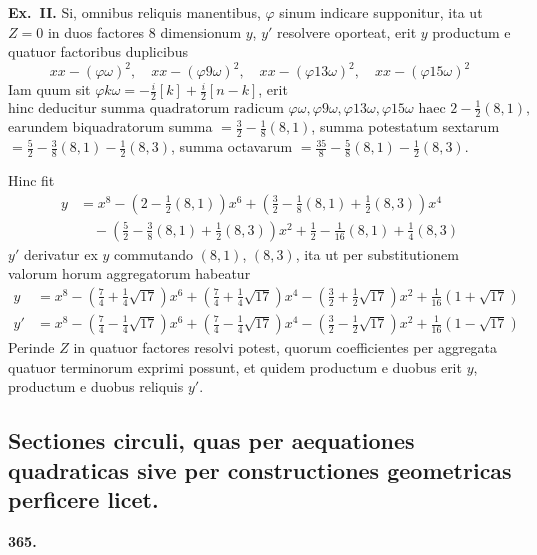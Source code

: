 \documentclass[12pt,a4paper]{article}
\theoremstyle{plain}
\theoremstyle{definition}
\theoremstyle{remark}
\begin{document}
\textbf{Ex.\ II.} Si, omnibus reliquis manentibus, $\varphi$ sinum indicare supponitur, ita ut $Z = 0$ in duos factores $8$ dimensionum $y$, $y'$ resolvere oporteat, erit $y$ productum e quatuor factoribus duplicibus
\[xx - (\varphi\omega)^2, \quad xx - (\varphi9\omega)^2, \quad xx - (\varphi13\omega)^2, \quad xx - (\varphi15\omega)^2\]
Iam quum sit $\varphi k\omega = -\tfrac{i}{2}[k] + \tfrac{i}{2}[n-k]$, erit
\[\text{hinc deducitur summa quadratorum radicum } \varphi\omega, \varphi9\omega, \varphi13\omega, \varphi15\omega \text{ haec } 2 - \tfrac{1}{2}(8,1),\]
earundem biquadratorum summa $= \tfrac{3}{2} - \tfrac{1}{8}(8,1)$, summa potestatum sextarum $= \tfrac{5}{2} - \tfrac{3}{8}(8,1) - \tfrac{1}{2}(8,3)$, summa octavarum $= \tfrac{35}{8} - \tfrac{5}{8}(8,1) - \tfrac{1}{2}(8,3)$.

Hinc fit
\begin{align*}
y &= x^8 - (2 - \tfrac{1}{2}(8,1))x^6 + (\tfrac{3}{2} - \tfrac{1}{8}(8,1) + \tfrac{1}{2}(8,3))x^4 \\
&\quad - (\tfrac{5}{2} - \tfrac{3}{8}(8,1) + \tfrac{1}{2}(8,3))x^2 + \tfrac{1}{2} - \tfrac{1}{16}(8,1) + \tfrac{1}{4}(8,3)
\end{align*}
$y'$ derivatur ex $y$ commutando $(8,1)$, $(8,3)$, ita ut per substitutionem valorum horum aggregatorum habeatur
\begin{align*}
y &= x^8 - (\tfrac{7}{4} + \tfrac{1}{4}\sqrt{17})x^6 + (\tfrac{7}{4} + \tfrac{1}{4}\sqrt{17})x^4 - (\tfrac{3}{2} + \tfrac{1}{2}\sqrt{17})x^2 + \tfrac{1}{16}(1 + \sqrt{17}) \\
y' &= x^8 - (\tfrac{7}{4} - \tfrac{1}{4}\sqrt{17})x^6 + (\tfrac{7}{4} - \tfrac{1}{4}\sqrt{17})x^4 - (\tfrac{3}{2} - \tfrac{1}{2}\sqrt{17})x^2 + \tfrac{1}{16}(1 - \sqrt{17})
\end{align*}
Perinde $Z$ in quatuor factores resolvi potest, quorum coefficientes per aggregata quatuor terminorum exprimi possunt, et quidem productum e duobus erit $y$, productum e duobus reliquis $y'$.


\subsection*{Sectiones circuli, quas per aequationes quadraticas sive per constructiones geometricas perficere licet.}

\begin{center}
\textbf{365.}
\end{center}
\end{document}
